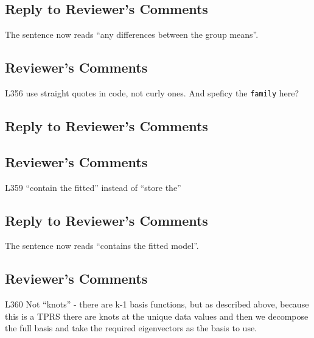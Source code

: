 \documentclass[
]{article}
\newcommand{\passthrough}[1]{#1}
\begin{document}
\hypertarget{section-25}{%
\subsection{\texorpdfstring{\textcolor{reviewersblue} {Reply to Reviewer's Comments}}{}}\label{section-25}}

The sentence now reads ``any differences between the group means''.

\hypertarget{reviewers-comments-25}{%
\subsection{Reviewer's Comments}\label{reviewers-comments-25}}

L356 use straight quotes in code, not curly ones. And speficy the \passthrough{\lstinline!family!} here?

\hypertarget{section-26}{%
\subsection{\texorpdfstring{\textcolor{reviewersblue} {Reply to Reviewer's Comments}}{}}\label{section-26}}

\hypertarget{reviewers-comments-26}{%
\subsection{Reviewer's Comments}\label{reviewers-comments-26}}

L359 ``contain the fitted'' instead of ``store the''

\hypertarget{section-27}{%
\subsection{\texorpdfstring{\textcolor{reviewersblue} {Reply to Reviewer's Comments}}{}}\label{section-27}}

The sentence now reads ``contains the fitted model''.

\hypertarget{reviewers-comments-27}{%
\subsection{Reviewer's Comments}\label{reviewers-comments-27}}

L360 Not ``knots'' - there are k-1 basis functions, but as described above, because this is a TPRS there are knots at the unique data values and then we decompose the full basis and take the required eigenvectors as the basis to use.
\end{document}
